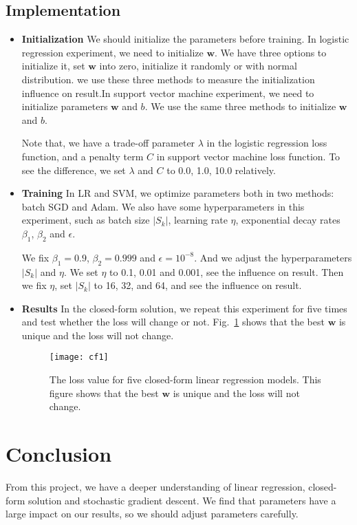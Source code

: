 \documentclass[journal, a4paper]{IEEEtran}
\begin{document}
\subsection{Implementation}

\begin{itemize}
  \item \textbf{Initialization} We should initialize the parameters before training. In logistic regression experiment, we need to initialize $\bm{w}$. We have three options to initialize it, set $\bm{w}$ into zero, initialize it randomly or with normal distribution. we use these three methods to measure the initialization influence on result.In support vector machine experiment, we need to initialize parameters $\bm{w}$ and $b$. We use the same three methods to initialize $\bm{w}$ and $b$.

      Note that, we have a trade-off parameter $\lambda$ in the logistic regression loss function, and a penalty term $C$ in support vector machine loss function. To see the difference, we set $\lambda$ and $C$ to 0.0, 1.0, 10.0 relatively.
%
  \item \textbf{Training} In LR and SVM, we optimize parameters both in two methods: batch SGD and Adam. We also have some hyperparameters in this experiment, such as batch size $\lvert S_{k}\rvert$, learning rate $\eta$, exponential decay rates $\beta_1$, $\beta_2$ and $\epsilon$. 
      
      We fix $\beta_1=0.9$, $\beta_2=0.999$ and $\epsilon=10^{-8}$. And we adjust the hyperparameters $\lvert S_{k} \rvert$ and $\eta$. We set $\eta$ to 0.1, 0.01 and 0.001, see the influence on result. Then we fix $\eta$, set $|S_{k}|$ to 16, 32, and 64, and see the influence on result.
%
  \item \textbf{Results} In the closed-form solution, we repeat this experiment for five times and test whether the loss will change or not. Fig.~\ref{fig:cf1} shows that the best $\bm{w}$ is unique and the loss will not change.

	\begin{figure}[!hbt]
		\begin{center}
		\texttt{[image: cf1]}
		\caption{The loss value for five closed-form linear regression models. This figure shows that the best $\bm{w}$ is unique and the loss will not change.}
		\label{fig:cf1}
		\end{center}
	\end{figure}


\end{itemize}


\section{Conclusion}
From this project, we have a deeper understanding of linear regression, closed-form solution and stochastic gradient descent. We find that parameters have a large impact on our results, so we should adjust parameters carefully.


\end{document}
